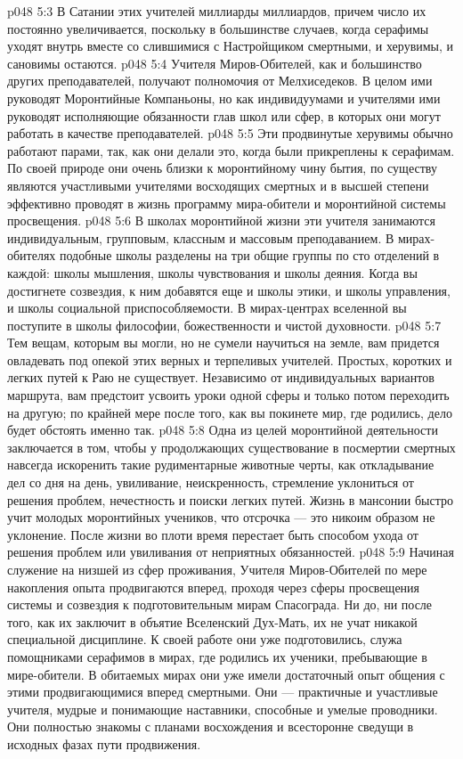 \vs p048 5:3 В Сатании этих учителей миллиарды миллиардов, причем число их постоянно увеличивается, поскольку в большинстве случаев, когда серафимы уходят внутрь вместе со слившимися с Настройщиком смертными, и херувимы, и сановимы остаются.
\vs p048 5:4 \pc Учителя Миров\hyp{}Обителей, как и большинство других преподавателей, получают полномочия от Мелхиседеков. В целом ими руководят Моронтийные Компаньоны, но как индивидуумами и учителями ими руководят исполняющие обязанности глав школ или сфер, в которых они могут работать в качестве преподавателей.
\vs p048 5:5 Эти продвинутые херувимы обычно работают парами, так, как они делали это, когда были прикреплены к серафимам. По своей природе они очень близки к моронтийному чину бытия, по существу являются участливыми учителями восходящих смертных и в высшей степени эффективно проводят в жизнь программу мира\hyp{}обители и моронтийной системы просвещения.
\vs p048 5:6 В школах моронтийной жизни эти учителя занимаются индивидуальным, групповым, классным и массовым преподаванием. В мирах\hyp{}обителях подобные школы разделены на три общие группы по сто отделений в каждой: школы мышления, школы чувствования и школы деяния. Когда вы достигнете созвездия, к ним добавятся еще и школы этики, и школы управления, и школы социальной приспособляемости. В мирах\hyp{}центрах вселенной вы поступите в школы философии, божественности и чистой духовности.
\vs p048 5:7 \pc Тем вещам, которым вы могли, но не сумели научиться на земле, вам придется овладевать под опекой этих верных и терпеливых учителей. Простых, коротких и легких путей к Раю не существует. Независимо от индивидуальных вариантов маршрута, вам предстоит усвоить уроки одной сферы и только потом переходить на другую; по крайней мере после того, как вы покинете мир, где родились, дело будет обстоять именно так.
\vs p048 5:8 Одна из целей моронтийной деятельности заключается в том, чтобы у продолжающих существование в посмертии смертных навсегда искоренить такие рудиментарные животные черты, как откладывание дел со дня на день, увиливание, неискренность, стремление уклониться от решения проблем, нечестность и поиски легких путей. Жизнь в мансонии быстро учит молодых моронтийных учеников, что отсрочка --- это никоим образом не уклонение. После жизни во плоти время перестает быть способом ухода от решения проблем или увиливания от неприятных обязанностей.
\vs p048 5:9 \pc Начиная служение на низшей из сфер проживания, Учителя Миров\hyp{}Обителей по мере накопления опыта продвигаются вперед, проходя через сферы просвещения системы и созвездия к подготовительным мирам Спасограда. Ни до, ни после того, как их заключит в объятие Вселенский Дух\hyp{}Мать, их не учат никакой специальной дисциплине. К своей работе они уже подготовились, служа помощниками серафимов в мирах, где родились их ученики, пребывающие в мире\hyp{}обители. В обитаемых мирах они уже имели достаточный опыт общения с этими продвигающимися вперед смертными. Они --- практичные и участливые учителя, мудрые и понимающие наставники, способные и умелые проводники. Они полностью знакомы с планами восхождения и всесторонне сведущи в исходных фазах пути продвижения.
